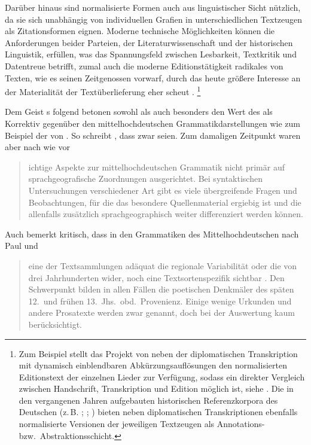 Darüber hinaus sind normalisierte Formen auch aus
linguistischer Sicht nützlich, da sie sich unabhängig von individuellen Grafien
in unterschiedlichen Textzeugen als Zitations\-formen eignen. Moderne
technische Möglich\-keiten können die Anforderungen beider Parteien, der
Literaturwissenschaft und der historischen Linguistik, erfüllen, was das
Spannungsfeld zwischen Lesbarkeit, Textkritik und Datentreue betrifft, zumal
auch die moderne Editionstätigkeit radikales
 von Texten, wie \citeauthor{wilhelm1932} es seinen Zeitgenossen
vorwarf, durch das heute größere Interesse an der Materialität der
Textüberlieferung eher scheut \autocite[vgl.][1306]{wegera2000}.%
%
	\footnote{Zum Beispiel stellt das Projekt  von
	\citet{ldmdigital} neben der diplomatischen Transkription mit dynamisch
	einblendbaren Abkürzungsauflösungen den normalisierten
	Editionstext der einzelnen Lieder zur Verfügung,
	sodass ein direkter Vergleich zwischen Handschrift, Transkription und
	Edition möglich ist, siehe . Die in den vergangenen
	Jahren aufgebauten historischen Referenzkorpora des
	Deutschen (z.\,B. \cite[vgl.][522--523]{dipper2015};
	\cite{rem}; \cite{ddd}) bieten neben diplomatischen Transkriptionen
	ebenfalls normalisierte Versionen der jeweiligen Textzeugen als
	Annotations- bzw.\ Abstraktionsschicht.}

Dem Geist \citeauthor{wilhelm1932}s folgend betonen sowohl \citet{deboor1976}
als auch \citet{schulze2011} besonders den Wert des \CAO{} als Korrektiv
gegenüber den mittelhochdeutschen
Grammatik\-darstel\-lungen wie zum Beispiel der von \citet{paul2007}. So
schreibt \citet[22]{schulze2011}, dass zwar  seien. Zum damaligen Zeitpunkt waren aber nach wie vor
\blockcquote[22]{schulze2011}{ichtige Aspekte zur
mittelhochdeutschen Grammatik \textelp{} nicht primär auf
sprachgeografische Zuordnungen ausgerichtet. Bei
syntaktischen Untersuchungen verschiedener Art gibt es viele übergreifende
Fragen und Beobachtungen, für die das besondere Quellenmaterial ergiebig ist
und die allenfalls zusätzlich sprachgeographisch weiter
differenziert werden können.}

Auch \citet{wegera2000} bemerkt kritisch, dass in den Grammatiken des
Mittelhochdeutschen nach Paul\nocite{paul2007} und
\citeauthor{mettke1993} \blockcquote[1305]{wegera2000}{eine der
Textsammlungen adäquat die regionale Variabilität oder die  von
drei Jahrhunderten wider, noch \textelp{} eine
Textsortenspezifik sichtbar . Den Schwerpunkt bilden in allen
Fällen die poetischen Denkmäler des späten 12.\ und frühen 13.~Jhs.\ obd.\
Provenienz. Einige wenige Urkunden und andere Prosatexte \textelp{}
werden zwar genannt, doch bei der Auswertung kaum berücksichtigt.}

